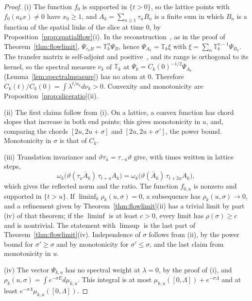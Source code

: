 \documentclass[11pt]{amsart}
\theoremstyle{definition}
\theoremstyle{remark}
\numberwithin{equation}{section}
\begin{document}
\begin{proof}
(i) The function $f_0$ is supported in $\{t>0\}$, so the lattice points with
$f_0(a_kx)\ne0$ have $x_0\ge1$, and $A_k=\sum_{n\ge1}\tau_nB_n$ is a finite
sum in which $B_n$ is a function of the spatial links of the slice at time
$0$, by Proposition~\ref{prop:spatialflow}(i). In the reconstruction~\cite{OS73,OS75,OSei78}, as in the proof of
Theorem~\ref{thm:flowlimit}, $\Psi_{\tau_nB}=\mathbb T_k^n\Psi_B$, hence
$\Psi_{A_k}=\mathbb T_k\xi$ with $\xi=\sum_n\mathbb T_k^{n-1}\Psi_{B_n}$. The
transfer matrix is self-adjoint and positive~\cite{OSei78,Lus77,Sei82}, and
its range is orthogonal to its kernel,
so the spectral measure $\nu_k$ of $\mathbb T_k$ at
$\Psi_k=C_k(0)^{-1/2}\Psi_{A_k}$ (Lemma~\ref{lem:spectralmeasure}) has no atom
at $0$. Therefore $C_k(t)/C_k(0)=\int\lambda^{t/a_k}d\nu_k>0$. Convexity and
monotonicity are Proposition~\ref{prop:sliceratio}(ii).

(ii) The first claims follow from (i). On a lattice, a convex function has
chord slopes that increase in both end points; this gives monotonicity in
$u$, and, comparing the chords $[2u,2u+\sigma]$ and $[2u,2u+\sigma']$, the
power bound. Monotonicity in $\sigma$ is that of $C_k$.

(iii) Translation invariance and $\vartheta\tau_u=\tau_{-u}\vartheta$ give,
with times written in lattice steps,
\[
\omega_k\bigl(\vartheta(\tau_u\bar A_k)\,\tau_{t+u}A_k\bigr)
=\omega_k\bigl(\vartheta(\bar A_k)\,\tau_{t+2u}A_k\bigr),
\]
which gives the reflected norm and the ratio. The function $f_{0,u}$ is nonzero and
supported in $\{t>u\}$. If $\liminf_k\rho_k(u,\sigma)=0$, a subsequence has
$\rho_k(u,\sigma)\to0$, and a refinement given by
Theorem~\ref{thm:flowlimit}(ii) has a trivial limit by part (iv) of that
theorem; if the $\liminf$ is at least $c>0$, every limit has $\rho(\sigma)\ge
c$ and is nontrivial. The statement with $\limsup$ is the last part of
Theorem~\ref{thm:flowlimit}(iv). Independence of $\sigma$ follows from (ii),
by the power bound for $\sigma'\ge\sigma$ and by monotonicity for
$\sigma'\le\sigma$, and the last claim from monotonicity in $u$.

(iv) The vector $\Psi_{k,u}$ has no spectral weight at $\lambda=0$, by the
proof of (i), and $\rho_k(u,\sigma)=\int e^{-\sigma E}d\mu_{k,u}$. This
integral is at most $\mu_{k,u}([0,\Lambda])+e^{-\sigma\Lambda}$ and at least
$e^{-\sigma\Lambda}\mu_{k,u}([0,\Lambda])$.
\end{proof}
\end{document}
